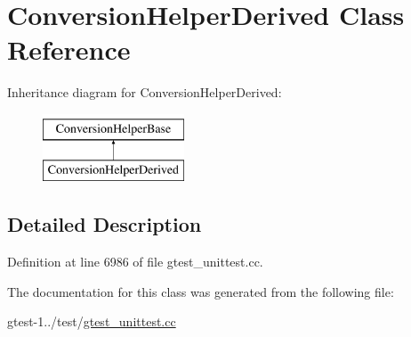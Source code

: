 \hypertarget{classConversionHelperDerived}{\section{\-Conversion\-Helper\-Derived \-Class \-Reference}
\label{d3/d77/classConversionHelperDerived}
}
\-Inheritance diagram for \-Conversion\-Helper\-Derived\-:\begin{figure}[H]
\begin{center}
\leavevmode
\includegraphics[height=2.000000cm]{d3/d77/classConversionHelperDerived}
\end{center}
\end{figure}


\subsection{\-Detailed \-Description}


\-Definition at line 6986 of file gtest\-\_\-unittest.\-cc.



\-The documentation for this class was generated from the following file\-:\begin{DoxyCompactItemize}
\item 
gtest-\/1../test/\hyperlink{gtest__unittest_8cc}{gtest\-\_\-unittest.\-cc}\end{DoxyCompactItemize}
